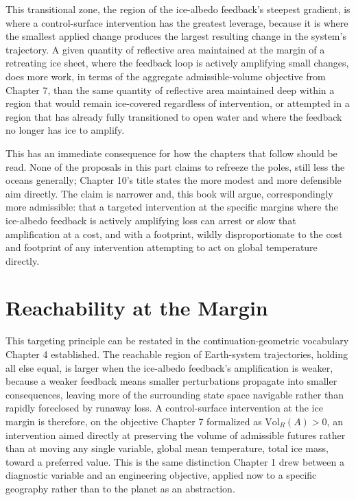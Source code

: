 \documentclass[11pt,oneside]{book}
\begin{document}
This transitional zone, the region of the ice-albedo feedback's steepest gradient, is where a control-surface intervention has the greatest leverage, because it is where the smallest applied change produces the largest resulting change in the system's trajectory. A given quantity of reflective area maintained at the margin of a retreating ice sheet, where the feedback loop is actively amplifying small changes, does more work, in terms of the aggregate admissible-volume objective from Chapter 7, than the same quantity of reflective area maintained deep within a region that would remain ice-covered regardless of intervention, or attempted in a region that has already fully transitioned to open water and where the feedback no longer has ice to amplify.

This has an immediate consequence for how the chapters that follow should be read. None of the proposals in this part claims to refreeze the poles, still less the oceans generally; Chapter 10's title states the more modest and more defensible aim directly. The claim is narrower and, this book will argue, correspondingly more admissible: that a targeted intervention at the specific margins where the ice-albedo feedback is actively amplifying loss can arrest or slow that amplification at a cost, and with a footprint, wildly disproportionate to the cost and footprint of any intervention attempting to act on global temperature directly.

\section*{Reachability at the Margin}

This targeting principle can be restated in the continuation-geometric vocabulary Chapter 4 established. The reachable region of Earth-system trajectories, holding all else equal, is larger when the ice-albedo feedback's amplification is weaker, because a weaker feedback means smaller perturbations propagate into smaller consequences, leaving more of the surrounding state space navigable rather than rapidly foreclosed by runaway loss. A control-surface intervention at the ice margin is therefore, on the objective Chapter 7 formalized as $\mathrm{Vol}_R(A) > 0$, an intervention aimed directly at preserving the volume of admissible futures rather than at moving any single variable, global mean temperature, total ice mass, toward a preferred value. This is the same distinction Chapter 1 drew between a diagnostic variable and an engineering objective, applied now to a specific geography rather than to the planet as an abstraction.
\end{document}
